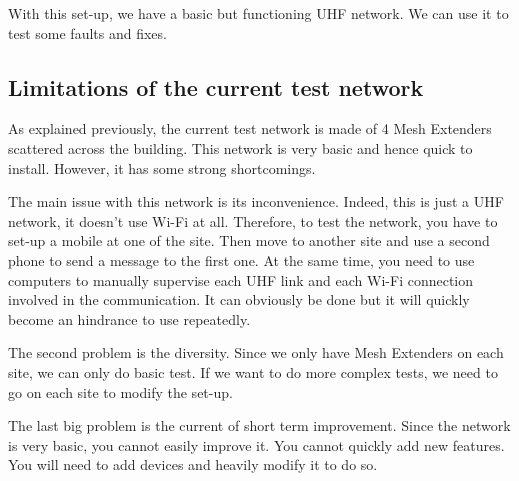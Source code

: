 With this set-up, we have a basic but functioning UHF network. We can use it to test some faults and fixes.


\subsection{Limitations of the current test network}

As explained previously, the current test network is made of 4 Mesh Extenders scattered across the building. This network is very basic and hence quick to install. However, it has some strong shortcomings.

The main issue with this network is its inconvenience. Indeed, this is just a UHF network, it doesn’t use Wi-Fi at all. Therefore, to test the network, you have to set-up a mobile at one of the site. Then move to another site and use a second phone to send a message to the first one. At the same time, you need to use computers to manually supervise each UHF link and each Wi-Fi connection involved in the communication. It can obviously be done but it will quickly become an hindrance to use repeatedly.

The second problem is the diversity. Since we only have Mesh Extenders on each site, we can only do basic test. If we want to do more complex tests, we need to go on each site to modify the set-up.

The last big problem is the current of short term improvement. Since the network is very basic, you cannot easily improve it. You cannot quickly add new features. You will need to add devices and heavily modify it to do so.



